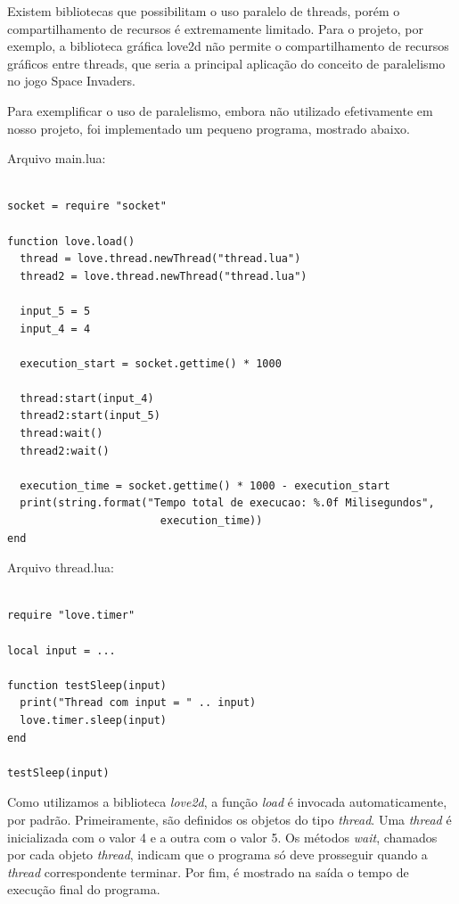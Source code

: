 \documentclass[rel_mlp]{iiufrgs}
\begin{document}
Existem bibliotecas que possibilitam o uso paralelo de threads, porém o compartilhamento de recursos é extremamente limitado. Para o projeto, por exemplo, a biblioteca gráfica love2d não permite o compartilhamento de recursos gráficos entre threads, que seria a principal aplicação do conceito de paralelismo no jogo Space Invaders.

Para exemplificar o uso de paralelismo, embora não utilizado efetivamente em nosso projeto, foi implementado um pequeno programa, mostrado abaixo.

Arquivo main.lua:

\begin{lstlisting}

socket = require "socket"

function love.load()
  thread = love.thread.newThread("thread.lua")
  thread2 = love.thread.newThread("thread.lua")

  input_5 = 5
  input_4 = 4

  execution_start = socket.gettime() * 1000

  thread:start(input_4)
  thread2:start(input_5)
  thread:wait()
  thread2:wait()

  execution_time = socket.gettime() * 1000 - execution_start
  print(string.format("Tempo total de execucao: %.0f Milisegundos",
                        execution_time))
end

\end{lstlisting}

\clearpage

Arquivo thread.lua:

\begin{lstlisting}

require "love.timer"

local input = ...

function testSleep(input)
  print("Thread com input = " .. input)
  love.timer.sleep(input)
end

testSleep(input)

\end{lstlisting}

Como utilizamos a biblioteca \textit{love2d}, a função \textit{load} é invocada automaticamente, por padrão. Primeiramente, são definidos os objetos do tipo \textit{thread}. Uma \textit{thread} é inicializada com o valor 4 e a outra com o valor 5. Os métodos \textit{wait}, chamados por cada objeto \textit{thread}, indicam que o programa só deve prosseguir quando a \textit{thread} correspondente terminar. Por fim, é mostrado na saída o tempo de execução final do programa.
\end{document}
